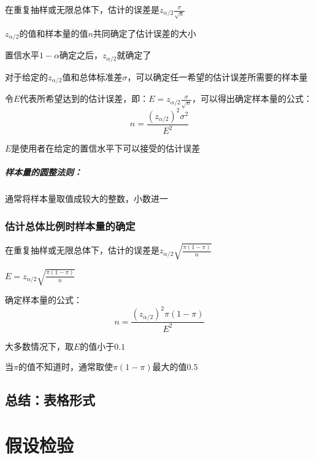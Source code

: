 \documentclass[UTF8,10pt]{book}
\begin{document}
                {\kaishu 在重复抽样或无限总体下，估计的误差是$z_{\alpha/2}  \frac{\sigma}{\sqrt{n}}$
                
                $z_{\alpha/2}$的值和样本量的值$n$共同确定了估计误差的大小
                
                置信水平$1-\alpha$确定之后，$z_{\alpha/2}$就确定了
                
                对于给定的$z_{\alpha/2}$值和总体标准差$\sigma$，可以确定任一希望的估计误差所需要的样本量}

                令$E$代表所希望达到的估计误差，即：$E = z_{\alpha/2}  \frac{\sigma}{\sqrt{n}}$，可以得出确定样本量的公式：
                    $$ n =  \frac{(z_{\alpha/2})^2 \sigma^2}{E^2}$$

                $E$是使用者在给定的置信水平下可以接受的估计误差

                \paragraph{样本量的圆整法则：}通常将样本量取值成较大的整数，小数进一

            \subsection{估计总体比例时样本量的确定}
                    
            {\kaishu 在重复抽样或无限总体下，估计的误差是$z_{\alpha/2}  \sqrt{\frac{\pi(1-\pi)}{n}}$

            $E = z_{\alpha/2} \sqrt{ \frac{\pi(1-\pi)}{n}}$}

            确定样本量的公式：
                $$ n =  \frac{(z_{\alpha/2})^2 \pi (1-\pi)}{E^2}$$

            {\kaishu 大多数情况下，取$E$的值小于$0.1$
            
            当$\pi$的值不知道时，通常取使$\pi(1-\pi)$最大的值$0.5$}

        \section{总结：表格形式}


\clearpage
\chapter{假设检验}
\end{document}
